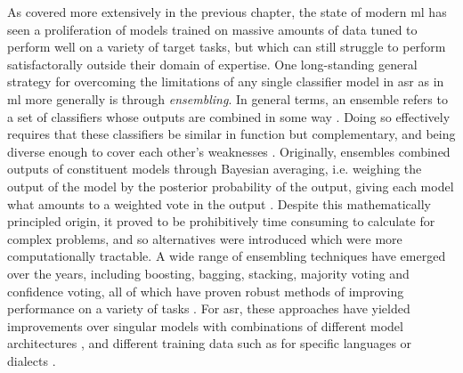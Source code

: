 \documentclass[thesis]{cluu}
\begin{document}
As covered more extensively in the previous chapter, the state of modern \gls{ml} has seen a proliferation of models trained on massive amounts of data tuned to perform well on a variety of target tasks, but which can still struggle to perform satisfactorally outside their domain of expertise. One long-standing general strategy for overcoming the limitations of any single classifier model in \gls{asr} as in \gls{ml} more generally is through \textit{ensembling}. In general terms, an ensemble refers to a set of classifiers whose outputs are combined in some way \parencite{dietterichEnsembleMethodsMachine2000}. Doing so effectively requires that these classifiers be similar in function but complementary, and being diverse enough to cover each other's weaknesses \parencite{hansenNeuralNetworkEnsembles1990}. Originally, ensembles combined outputs of constituent models through Bayesian averaging, i.e. weighing the output of the model by the posterior probability of the output, giving each model what amounts to a weighted vote in the output \parencite{dietterichEnsembleMethodsMachine2000}. Despite this mathematically principled origin, it proved to be prohibitively time consuming to calculate for complex problems, and so alternatives were introduced which were more computationally tractable. A wide range of ensembling techniques have emerged over the years, including boosting, bagging, stacking, majority voting and confidence voting, all of which have proven robust methods of improving performance on a variety of tasks \parencite[see][inter alia]{maclinEmpiricalEvaluationBagging1997,dengScalableStackingLearning2012,fiscus1997post,gitmanConfidencebasedEnsemblesEndtoEnd2023}. For \gls{asr}, these approaches have yielded improvements over singular models with combinations of different model architectures \parencite{arunkumarInvestigationEnsembleFeatures2022,dengEnsembleDeepLearning2014}, and different training data such as for specific languages or dialects \parencite[inter alia]{agrawalLearningWhenTrust2023,gitmanConfidencebasedEnsemblesEndtoEnd2023}.
\end{document}
